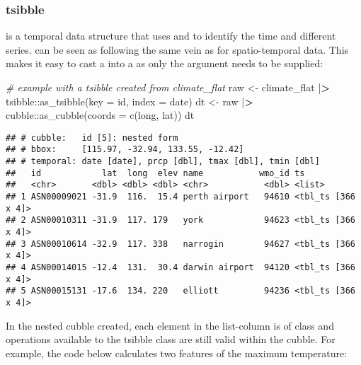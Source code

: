 \documentclass{article}
\newenvironment{Shaded}{\begin{snugshade}}{\end{snugshade}}
\newcommand{\AttributeTok}[1]{\textcolor[rgb]{0.77,0.63,0.00}{#1}}
\newcommand{\CommentTok}[1]{\textcolor[rgb]{0.56,0.35,0.01}{\textit{#1}}}
\newcommand{\ErrorTok}[1]{\textcolor[rgb]{0.64,0.00,0.00}{\textbf{#1}}}
\newcommand{\FunctionTok}[1]{\textcolor[rgb]{0.00,0.00,0.00}{#1}}
\newcommand{\NormalTok}[1]{#1}
\newcommand{\OtherTok}[1]{\textcolor[rgb]{0.56,0.35,0.01}{#1}}
\newcommand{\SpecialCharTok}[1]{\textcolor[rgb]{0.00,0.00,0.00}{#1}}
\begin{document}
\hypertarget{tsibble}{%
\subsubsection{tsibble}\label{tsibble}}

 is a temporal data structure that uses  and  to identify the time and different series.  can be seen as following the same vein as  for spatio-temporal data. This makes it easy to cast a  into a  as only the  argument needs to be supplied:

\begin{Shaded}
\begin{Highlighting}[]
\CommentTok{\# example with a tsibble created from climate\_flat}
\NormalTok{raw }\OtherTok{\textless{}{-}}\NormalTok{ climate\_flat }\SpecialCharTok{|}\ErrorTok{\textgreater{}}\NormalTok{ tsibble}\SpecialCharTok{::}\FunctionTok{as\_tsibble}\NormalTok{(}\AttributeTok{key =}\NormalTok{ id, }\AttributeTok{index =}\NormalTok{ date)}
\NormalTok{dt }\OtherTok{\textless{}{-}}\NormalTok{  raw }\SpecialCharTok{|}\ErrorTok{\textgreater{}}\NormalTok{ cubble}\SpecialCharTok{::}\FunctionTok{as\_cubble}\NormalTok{(}\AttributeTok{coords =} \FunctionTok{c}\NormalTok{(long, lat))}
\NormalTok{dt}
\end{Highlighting}
\end{Shaded}

\begin{verbatim}
## # cubble:   id [5]: nested form
## # bbox:     [115.97, -32.94, 133.55, -12.42]
## # temporal: date [date], prcp [dbl], tmax [dbl], tmin [dbl]
##   id            lat  long  elev name           wmo_id ts                
##   <chr>       <dbl> <dbl> <dbl> <chr>           <dbl> <list>            
## 1 ASN00009021 -31.9  116.  15.4 perth airport   94610 <tbl_ts [366 x 4]>
## 2 ASN00010311 -31.9  117. 179   york            94623 <tbl_ts [366 x 4]>
## 3 ASN00010614 -32.9  117. 338   narrogin        94627 <tbl_ts [366 x 4]>
## 4 ASN00014015 -12.4  131.  30.4 darwin airport  94120 <tbl_ts [366 x 4]>
## 5 ASN00015131 -17.6  134. 220   elliott         94236 <tbl_ts [366 x 4]>
\end{verbatim}

In the nested cubble created, each element in the list-column  is of  class and operations available to the tsibble class are still valid within the cubble. For example, the code below calculates two features of the maximum temperature:
\end{document}
